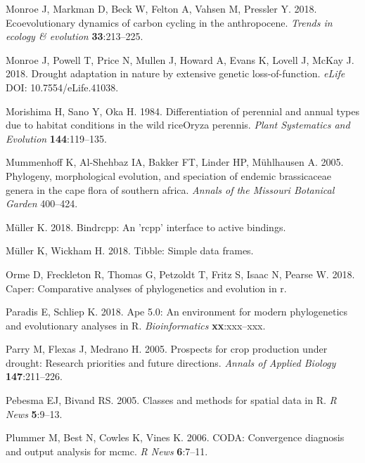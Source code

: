 \documentclass[man,floatsintext]{apa6}
\theoremstyle{definition}
\theoremstyle{definition}
\theoremstyle{definition}
\theoremstyle{remark}
\begin{document}
\leavevmode\hypertarget{ref-monroe2018ecoevolutionary}{}%
Monroe J, Markman D, Beck W, Felton A, Vahsen M, Pressler Y. 2018.
Ecoevolutionary dynamics of carbon cycling in the anthropocene.
\emph{Trends in ecology \& evolution} \textbf{33}:213--225.

\leavevmode\hypertarget{ref-monroe2018drought}{}%
Monroe J, Powell T, Price N, Mullen J, Howard A, Evans K, Lovell J,
McKay J. 2018. Drought adaptation in nature by extensive genetic
loss-of-function. \emph{eLife} DOI: 10.7554/eLife.41038.

\leavevmode\hypertarget{ref-morishima1984differentiation}{}%
Morishima H, Sano Y, Oka H. 1984. Differentiation of perennial and
annual types due to habitat conditions in the wild riceOryza perennis.
\emph{Plant Systematics and Evolution} \textbf{144}:119--135.

\leavevmode\hypertarget{ref-mummenhoff2005phylogeny}{}%
Mummenhoff K, Al-Shehbaz IA, Bakker FT, Linder HP, Mühlhausen A. 2005.
Phylogeny, morphological evolution, and speciation of endemic
brassicaceae genera in the cape flora of southern africa. \emph{Annals
of the Missouri Botanical Garden} 400--424.

\leavevmode\hypertarget{ref-R-bindrcpp}{}%
Müller K. 2018. Bindrcpp: An 'rcpp' interface to active bindings.

\leavevmode\hypertarget{ref-R-tibble}{}%
Müller K, Wickham H. 2018. Tibble: Simple data frames.

\leavevmode\hypertarget{ref-R-caper}{}%
Orme D, Freckleton R, Thomas G, Petzoldt T, Fritz S, Isaac N, Pearse W.
2018. Caper: Comparative analyses of phylogenetics and evolution in r.

\leavevmode\hypertarget{ref-R-ape}{}%
Paradis E, Schliep K. 2018. Ape 5.0: An environment for modern
phylogenetics and evolutionary analyses in R. \emph{Bioinformatics}
\textbf{xx}:xxx--xxx.

\leavevmode\hypertarget{ref-parry2005prospects}{}%
Parry M, Flexas J, Medrano H. 2005. Prospects for crop production under
drought: Research priorities and future directions. \emph{Annals of
Applied Biology} \textbf{147}:211--226.

\leavevmode\hypertarget{ref-R-sp}{}%
Pebesma EJ, Bivand RS. 2005. Classes and methods for spatial data in R.
\emph{R News} \textbf{5}:9--13.

\leavevmode\hypertarget{ref-R-coda}{}%
Plummer M, Best N, Cowles K, Vines K. 2006. CODA: Convergence diagnosis
and output analysis for mcmc. \emph{R News} \textbf{6}:7--11.
\end{document}
